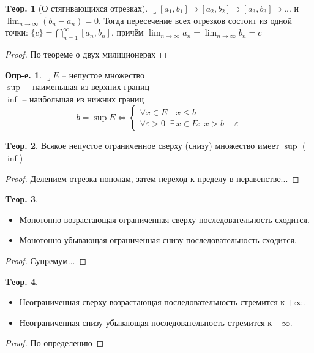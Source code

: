 \documentclass[a4paper,12pt]{article}
\numberwithin{figure}{section}
\theoremstyle{definition}
\newtheorem{definition}{Опр-е.}[section]
\newtheorem{theorem}{Tеор.}[section]
\def\DS{\displaystyle}
\def\.{\;\;}
\def\eps{\varepsilon}
\def\ntoinf{n\to\infty}
\def\leqs{\leqslant}
\def\lets{{\huge$\lrcorner$}\space}
\begin{document}
\begin{theorem}[О стягивающихся отрезках]
	\lets $[a_1,b_1] \supset [a_2,b_2] \supset [a_3,b_3] \supset ...$
	и $\DS \lim_{\ntoinf}(b_n-a_n) = 0$.
	Тогда пересечение всех отрезков состоит из одной точки:
	$\DS \{c\} = \bigcap_{n=1}^{\infty} [a_n,b_n]$, причём
	$\DS \lim_{\ntoinf}a_n = \lim_{\ntoinf}b_n = c$
\end{theorem}
\begin{proof} По теореме о двух милиционерах \end{proof}


\begin{definition}
	\lets $E$ -- непустое множество \\
	$\sup$ -- наименьшая из верхних границ \\
	$\inf$ -- наибольшая из нижних границ
	\[ b = \sup E \Longleftrightarrow
		\begin{cases*}
			\forall x \in E \quad x \leqs b \\
			\forall \eps > 0 \. \exists\, x \in E : \;  x > b - \eps
		\end{cases*}
	\]
\end{definition}


\begin{theorem}
	Всякое непустое ограниченное сверху (снизу) множество имеет $\sup$ ($\inf$)
\end{theorem}
\begin{proof} Делением отрезка пополам, затем переход к пределу в неравенстве... \end{proof}


\begin{theorem}
	\leavevmode
	\begin{itemize}
		\item Монотонно возрастающая ограниченная сверху последовательность сходится.
		\item Монотонно убывающая ограниченная снизу последовательность сходится.
	\end{itemize}
\end{theorem}
\begin{proof} Супремум... \end{proof}


\begin{theorem}
	\leavevmode
	\begin{itemize}
		\item Неограниченная сверху возрастающая последовательность стремится к $+\infty$.
		\item Неограниченная снизу убывающая последовательность стремится к $-\infty$.
	\end{itemize}
\end{theorem}
\begin{proof} По определению \end{proof}
\end{document}
